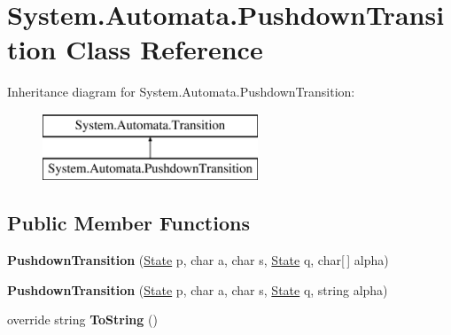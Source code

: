 \hypertarget{class_system_1_1_automata_1_1_pushdown_transition}{}\section{System.\+Automata.\+Pushdown\+Transition Class Reference}
\label{class_system_1_1_automata_1_1_pushdown_transition}
Inheritance diagram for System.\+Automata.\+Pushdown\+Transition\+:\begin{figure}[H]
\begin{center}
\leavevmode
\includegraphics[height=2.000000cm]{class_system_1_1_automata_1_1_pushdown_transition}
\end{center}
\end{figure}
\subsection*{Public Member Functions}
\begin{DoxyCompactItemize}
\item 
\mbox{\label{class_system_1_1_automata_1_1_pushdown_transition_afc1ee3b1685d5de0afdd765d0257420a}} 
{\bfseries Pushdown\+Transition} (\mbox{\hyperlink{class_system_1_1_automata_1_1_state}{State}} p, char a, char s, \mbox{\hyperlink{class_system_1_1_automata_1_1_state}{State}} q, char\mbox{[}$\,$\mbox{]} alpha)
\item 
\mbox{\label{class_system_1_1_automata_1_1_pushdown_transition_a093f85093482d2a37a08c87bc01d5c96}} 
{\bfseries Pushdown\+Transition} (\mbox{\hyperlink{class_system_1_1_automata_1_1_state}{State}} p, char a, char s, \mbox{\hyperlink{class_system_1_1_automata_1_1_state}{State}} q, string alpha)
\item 
\mbox{\label{class_system_1_1_automata_1_1_pushdown_transition_ac0cf59a17fa2365c0d1755c609af948a}} 
override string {\bfseries To\+String} ()
\end{DoxyCompactItemize}
